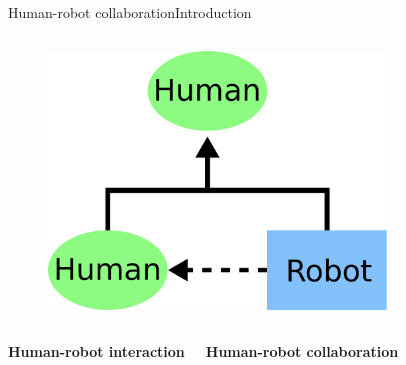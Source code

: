 \begin{frame}{Human-robot collaboration}{Introduction}
\begin{columns}
\begin{minipage}{\textwidth}
\begin{figure}
\centering
\includegraphics[width = 0.8\textwidth]{./figure/HR_org_chart2}
\end{figure}
\end{minipage}

\end{columns}

\bigskip

\begin{columns}

\begin{center}
\textbf{Human-robot interaction}
\end{center}


\begin{center}
\textbf{Human-robot collaboration}
\end{center}

\end{columns}

\end{frame}


